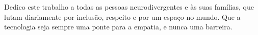 
\renewcommand{\dedicatorianame}{DEDICATÓRIA}

\begin{dedicatoria}

    Dedico este trabalho a todas as pessoas neurodivergentes e às suas famílias, que lutam diariamente por inclusão, respeito e por um espaço no mundo. Que a tecnologia seja sempre uma ponte para a empatia, e nunca uma barreira. 

\end{dedicatoria}

